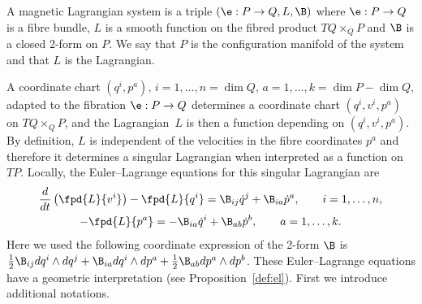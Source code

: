 \begin{definition} A magnetic Lagrangian system is a triple $(\e:P\to Q, L, \B)$ where $\e:P\to Q$ is a f\/ibre bundle, $L$ is a smooth function on the f\/ibred product $TQ\times_Q P$ and $\B$ is a closed 2-form on $P$. We say that $P$ is the conf\/iguration manifold of the system and that $L$ is the Lagrangian. \end{definition}

A coordinate chart $(q^i,p^a)$, $i=1,\ldots,n=\dim Q$, $a=1,\ldots,k=\dim P-\dim Q$,  adapted to the f\/ibration $\e: P\to Q$ determines a coordinate chart $(q^i,v^i,p^a)$ on $TQ\times_Q P$, and the Lagrangian~$L$ is then a function depending on $(q^i,v^i,p^a)$. By def\/inition, $L$ is independent of the velocities in the f\/ibre coordinates $p^a$ and therefore it determines a singular Lagrangian when interpreted as a function on $TP$. Locally, the Euler--Lagrange equations for this singular Lagrangian are
\begin{gather*}
\frac{d}{dt}\left(\fpd{L}{v^i}\right) -\fpd{L}{q^i}=\B_{ij} \dot q^j + \B_{ia} \dot p^a,\qquad  i=1,\ldots,n,\\
  -\fpd{L}{p^a}=-\B_{ia} \dot q^i+ \B_{ab}\dot p^b,\qquad a=1,\ldots,k.
\end{gather*}
Here we used the following coordinate expression of the 2-form $\B$ is $\frac12 \B_{ij} dq^i \wedge dq^j + \B_{ia}dq^i\wedge dp^a + \frac12 \B_{ab} dp^a\wedge dp^b$.
These Euler--Lagrange equations have a geometric interpretation (see Proposition~\ref{def:el}). First we introduce additional notations.
